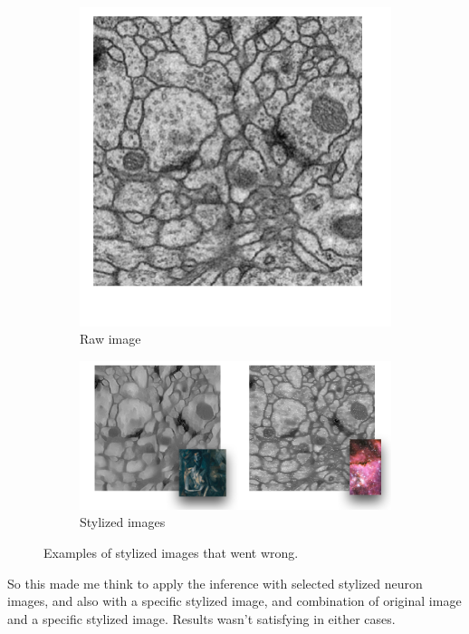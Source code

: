 \documentclass[12pt, a4paper]{scrartcl}
\begin{document}
\begin{figure}[h]
\centering
\begin{subfigure}{.3\textwidth}
  \centering
  \includegraphics[width=.9\linewidth]{wo1}
  \caption{Raw image}
  \label{fig:wo1}
\end{subfigure}%
\begin{subfigure}{.63\textwidth}
  \centering
  \includegraphics[width=.9\linewidth]{wo2}
  \caption{Stylized images}
  \label{fig:wo2}
\end{subfigure}
\caption{Examples of stylized images that went wrong.}
\label{fig:washedout}
\end{figure}

So this made me think to apply the inference with selected stylized neuron images, and also with a specific stylized image, and combination of original image and a specific stylized image. Results wasn't satisfying in either cases. 
\end{document}
